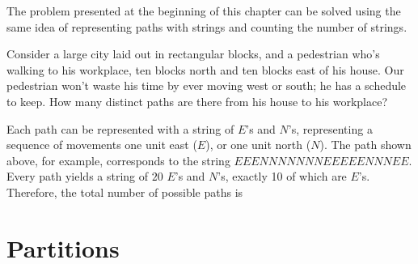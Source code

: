 \par
The problem presented at the beginning of this chapter can be solved using the same idea of representing paths with strings and counting the number of strings.

\begin{examp}Consider a large city laid out in rectangular blocks, and a pedestrian who's walking to his workplace, ten blocks north and ten blocks east of his house. Our pedestrian won't waste his time by ever moving west or south; he has a schedule to keep. How many distinct paths are there from his house to his workplace?

\begin{center}
\end{center}

\par
\noindent Each path can be represented with a string of $E$'s and $N$'s, representing a sequence of movements one unit east ($E$), or one unit north ($N$). The path shown above, for example, corresponds to the string $EEENNNNNNNEEEEENNNEE$. Every path yields a string of $20$ $E$'s and $N$'s, exactly 10 of which are $E$'s. Therefore, the total number of possible paths is


\end{examp}

\color{red}

\section{Partitions}

